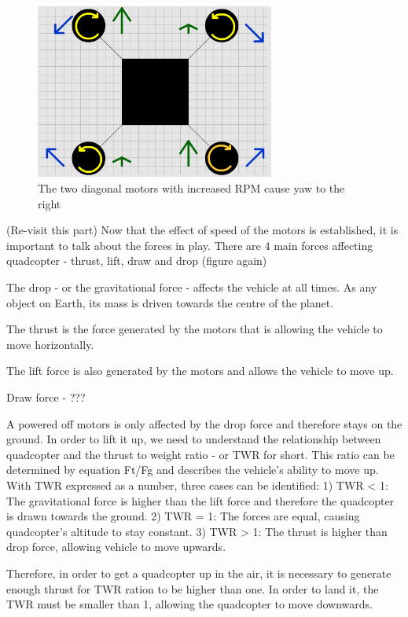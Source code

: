 \begin{figure}[H]
  \centering
    \includegraphics[width=0.7\textwidth]{images/droneYaw.png}
	\caption{The two diagonal motors with increased RPM cause yaw to the right}
	\label{droneYaw}
\end{figure}

(Re-visit this part)
Now that the effect of speed of the motors is established, it is important to talk about the forces in play. There are 4 main forces affecting quadcopter - thrust, lift, draw and drop (figure again)

The drop - or the gravitational force - affects the vehicle at all times. As any object on Earth, its mass is driven towards the centre of the planet.

The thrust is the force generated by the motors that is allowing the vehicle to move horizontally.

The lift force is also generated by the motors and allows the vehicle to move up.

Draw force - ???

A powered off motors is only affected by the drop force and therefore stays on the ground. In order to lift it up, we need to understand the relationship between quadcopter and the thrust to weight ratio - or TWR for short. This ratio can be determined by equation Ft/Fg and describes the vehicle's ability to move up. With TWR expressed as a number, three cases can be identified:
1) TWR < 1: The gravitational force is higher than the lift force and therefore the quadcopter is drawn towards the ground.
2) TWR = 1: The forces are equal, causing quadcopter's altitude to stay constant.
3) TWR > 1: The thrust is higher than drop force, allowing vehicle to move upwards.

Therefore, in order to get a quadcopter up in the air, it is necessary to generate enough thrust for TWR ration to be higher than one. In order to land it, the TWR must be smaller than 1, allowing the quadcopter to move downwards.




